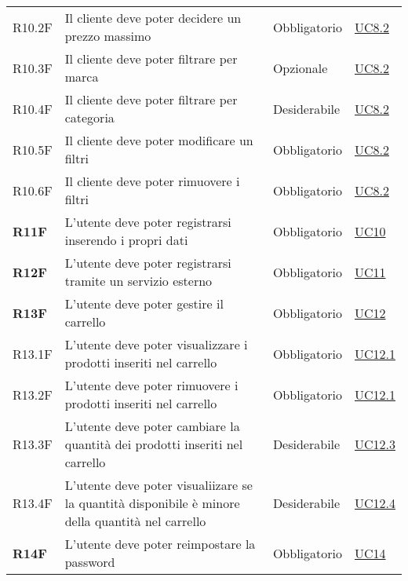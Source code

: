\begin{center}
\begin{longtable}[!h]{p{50px} p{210px} p{80px} p{50px}}
        R10.2F                                          & Il cliente deve poter decidere un prezzo massimo & Obbligatorio & \hyperref[sec:UC8]{UC8.2} \\
        R10.3F      & Il cliente deve poter filtrare per marca & Opzionale & \hyperref[sec:UC8]{UC8.2} \\
        R10.4F  & Il cliente deve poter filtrare per categoria & Desiderabile & \hyperref[sec:UC8]{UC8.2} \\
        R10.5F & Il cliente deve poter modificare un filtri & Obbligatorio & \hyperref[sec:UC8]{UC8.2} \\
        R10.6F  & Il cliente deve poter rimuovere i filtri & Obbligatorio & \hyperref[sec:UC8]{UC8.2} \\
        
        \textbf{R11F}                                   & L'utente deve poter registrarsi inserendo i propri dati                                          & Obbligatorio             & \hyperref[sec:UC10]{UC10}     \\
        \textbf{R12F}                                   & L'utente deve poter registrarsi tramite un servizio esterno                                      & Obbligatorio             & \hyperref[sec:UC11]{UC11}     \\
        \textbf{R13F}                           & L'utente deve poter gestire il carrello                                                                                  & Obbligatorio & \hyperref[sec:UC12]{UC12} \\
        R13.1F                               & L'utente deve poter visualizzare i prodotti inseriti nel carrello                                & Obbligatorio             & \hyperref[sec:UC12.1]{UC12.1} \\
        R13.2F                               & L'utente deve poter rimuovere i prodotti inseriti nel carrello                                   & Obbligatorio             & \hyperref[sec:UC12.1]{UC12.1} \\
        R13.3F                               & L'utente deve poter cambiare la quantità dei prodotti inseriti nel carrello                      & Desiderabile             & \hyperref[sec:UC12.3]{UC12.3} \\
        R13.4F                               & L'utente deve poter visualiizare se la quantità disponibile è minore della quantità nel carrello & Desiderabile             & \hyperref[sec:UC12.4]{UC12.4} \\
        \textbf{R14F}                                & L'utente deve poter reimpostare la password                                                      & Obbligatorio             & \hyperref[sec:UC14]{UC14}     \\

\end{longtable}
\end{center}
